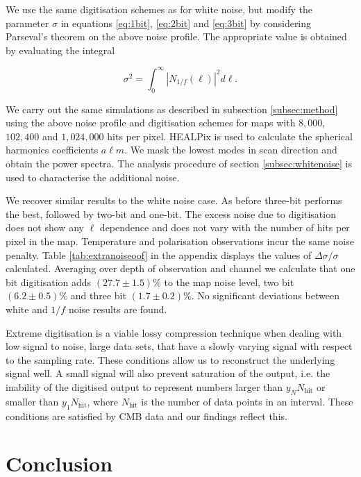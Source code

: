 \documentclass[apj]{emulateapj}
\begin{document}
We use the same digitisation schemes as for white noise, but modify the parameter $\sigma$ in equations \ref{eq:1bit}, \ref{eq:2bit} and \ref{eq:3bit} by considering Parseval's theorem on the above noise profile. The appropriate value is obtained by evaluating the integral

\begin{equation}
\sigma^2 = \int_0^\infty \left| N_{1/f}(\ell) \right|^2 d\ell.
\end{equation}

We carry out the same simulations as described in subsection \ref{subsec:method} using the above noise profile and digitisation schemes for maps with $8,000$, $102,400$ and $1,024,000$ hits per pixel. HEALPix is used to calculate the spherical harmonics coefficients $a\ell m$. We mask the lowest modes in scan direction and obtain the power spectra. The analysis procedure of section \ref{subsec:whitenoise} is used to characterise the additional noise.

We recover similar results to the white noise case. As before three-bit performs the best, followed by two-bit and one-bit. The excess noise due to digitisation does not show any $\ell$ dependence and does not vary with the number of hits per pixel in the map. Temperature and polarisation observations incur the same noise penalty. Table \ref{tab:extranoiseoof} in the appendix displays the values of $\Delta \sigma / \sigma$ calculated. Averaging over depth of observation and channel we calculate that one bit digitisation adds $(27.7\pm 1.5)\%$ to the map noise level, two bit $(6.2\pm0.5)\%$ and three bit $(1.7\pm0.2)\%$. No significant deviations between white and $1/f$ noise results are found.

Extreme digitisation is a viable lossy compression technique when dealing with low signal to noise, large data sets, that have a slowly varying signal with respect to the sampling rate. These conditions allow us to reconstruct the underlying signal well. A small signal will also prevent saturation of the output, i.e. the inability of the digitised output to represent numbers larger than $y_N N_{\mathrm{hit}}$ or smaller than $y_1 N_{\mathrm{hit}}$, where $N_{\mathrm{hit}}$ is the number of data points in an interval. These conditions are satisfied by CMB data and our findings reflect this.

\section{Conclusion}
\label{sec:conclusions}
\end{document}
